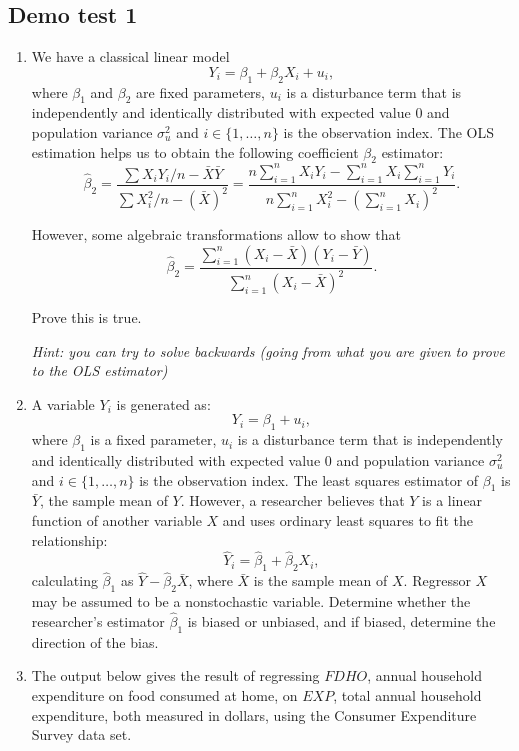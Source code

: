 
\subsection{Demo test 1}

\begin{enumerate}
    \item We have a classical linear model 
\[
    Y_i = \beta_1 + \beta_2 X_i + u_i,
\]
where $\beta_1$ and $\beta_2$ are fixed parameters, $u_i$ is a disturbance term that is independently and identically distributed with expected value 0 and population variance $\sigma_u^2$ and $i \in \{1, \ldots, n\}$ is the observation index. 
The OLS estimation helps us to obtain the following coefficient $\beta_2$ estimator: 
\[
    \hat\beta_2 = \frac{\sum {X_iY_i}/n - \bar X \bar Y}
    {\sum {X_i^2}/n - (\bar X)^2} = 
    \frac{n \sum_{i=1}^n X_i Y_i - \sum_{i=1}^n X_i \sum_{i=1}^n Y_i}
    {n \sum_{i=1}^n X_i^2 - (\sum_{i=1}^n X_i)^2}.
\]

However, some algebraic transformations allow to show that 
\[
    \hat\beta_2 = \frac{\sum_{i=1}^n (X_i - \bar X)(Y_i - \bar Y)}
    {\sum_{i=1}^n (X_i - \bar X)^2}.
\]

Prove this is true. 

{\itshape Hint: you can try to solve backwards (going from what you are given to prove to the OLS estimator)}


\item 
A variable $Y_i$ is generated as: 
\[
    Y_i = \beta_1 + u_i,
\]
where $\beta_1$ is a fixed parameter, $u_i$ is a disturbance term that is independently and identically distributed with expected value 0 and population variance $\sigma_u^2$ and $i \in \{1, \ldots, n\}$ is the observation index. 
The least squares estimator of $\beta_1$ is $\bar Y$, the sample mean of $Y$. 
However, a researcher believes that $Y$ is a linear function of another variable $X$ and uses ordinary least squares to fit the relationship:
\[
    \hat Y_i = \hat \beta_1 + \hat \beta_2 X_i,
\]
calculating $\hat \beta_1$ as $\hat Y - \hat \beta_2 \bar X$, where $\bar X$ is the sample mean of $X$. 
Regressor $X$ may be assumed to be a nonstochastic variable. 
Determine whether the researcher’s estimator $\hat \beta_1$ is biased or unbiased, and if biased, determine the direction of the bias.


\item The output below gives the result of regressing $FDHO$, annual household expenditure on food consumed at home, on $EXP$, total annual household expenditure, both measured in dollars, using the Consumer Expenditure Survey data set. 


\end{enumerate}
